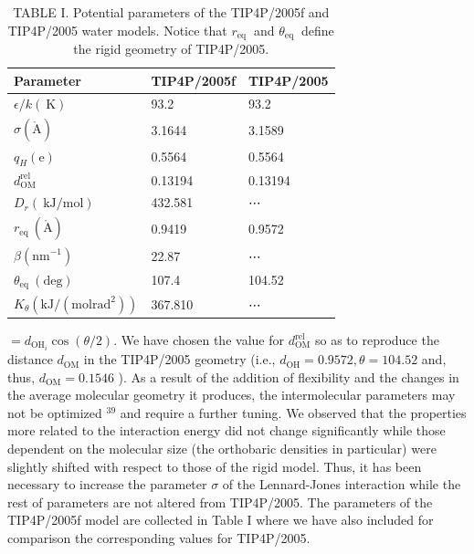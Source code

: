 \documentclass[10pt]{article}
\def\AA{\mathring{\mathrm{A}}}
\begin{document}
\begin{table}[h]
\begin{center}
\captionsetup{labelformat=empty}
\caption{TABLE I. Potential parameters of the TIP4P/2005f and TIP4P/2005 water models. Notice that $r_{\text {eq }}$ and $\theta_{\text {eq }}$ define the rigid geometry of TIP4P/2005.}
\begin{tabular}{|l|l|l|}
\hline
Parameter & TIP4P/2005f & TIP4P/2005 \\
\hline
$\epsilon / k(\mathrm{~K})$ & 93.2 & 93.2 \\
\hline
$\sigma(\AA)$ & 3.1644 & 3.1589 \\
\hline
$q_{H}(\mathrm{e})$ & 0.5564 & 0.5564 \\
\hline
$d_{\text {OM }}^{\text {rel }}$ & 0.13194 & 0.13194 \\
\hline
$D_{r}(\mathrm{~kJ} / \mathrm{mol})$ & 432.581 & ⋯ \\
\hline
$r_{\text {eq }}(\AA)$ & 0.9419 & 0.9572 \\
\hline
$\beta\left(\mathrm{nm}^{-1}\right)$ & 22.87 & ⋯ \\
\hline
$\theta_{\text {eq }}(\mathrm{deg})$ & 107.4 & 104.52 \\
\hline
$K_{\theta}\left(\mathrm{kJ} /\left(\mathrm{mol} \mathrm{rad}^{2}\right)\right)$ & 367.810 & ⋯ \\
\hline
\end{tabular}
\end{center}
\end{table}

$=d_{\mathrm{OH}_{i}} \cos (\theta / 2)$. We have chosen the value for $d_{\mathrm{OM}}^{\text {rel }}$ so as to reproduce the distance $d_{\mathrm{OM}}$ in the TIP4P/2005 geometry (i.e., $d_{\mathrm{OH}}=0.9572, \theta=104.52$ and, thus, $d_{\mathrm{OM}}=0.1546$ ). As a result of the addition of flexibility and the changes in the average molecular geometry it produces, the intermolecular parameters may not be optimized ${ }^{39}$ and require a further tuning. We observed that the properties more related to the interaction energy did not change significantly while those dependent on the molecular size (the orthobaric densities in particular) were slightly shifted with respect to those of the rigid model. Thus, it has been necessary to increase the parameter $\sigma$ of the Lennard-Jones interaction while the rest of parameters are not altered from TIP4P/2005. The parameters of the TIP4P/2005f model are collected in Table I where we have also included for comparison the corresponding values for TIP4P/2005.
\end{document}
